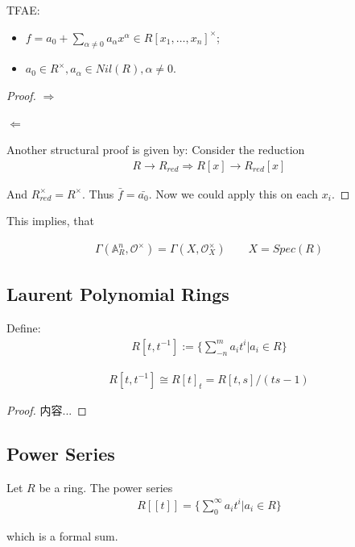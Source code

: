 \documentclass[Total.tex]{subfiles}
\begin{document}
			\begin{proposition}
				TFAE:
				\begin{itemize}
					\item $f=a_0+\sum_{\alpha\not=0} a_\alpha x^\alpha\in R[x_1,\dots,x_n]^\times$;
					\item $a_0\in R^\times,a_\alpha\in Nil(R),\alpha\not=0$. 
				\end{itemize}
			\end{proposition}
			\begin{proof}
				$\Rightarrow$
				
				$\Leftarrow$ 
				
				
				Another structural proof is given by: Consider the reduction
				\begin{gather*}
					R\rightarrow R_{red}\Rightarrow R[x]\rightarrow R_{red}[x]
				\end{gather*}
				
				And $R_{red}^\times=R^\times$. Thus $\bar{f}=\bar{a_0}$. Now we could apply this on each $x_i$. 
			\end{proof}
			
			This implies, that 
			
			\begin{gather*}
				\Gamma(\mathbb{A}^n_R,\mathcal{O}^\times)=\Gamma(X,\mathcal{O}^\times_X)\qquad X=Spec(R)
			\end{gather*}
		\subsection{Laurent Polynomial Rings}
			\begin{Def}
				Define:
				\begin{gather*}
					R[t,t^{-1}]:=\{\sum_{-n}^m a_i t^i|a_i\in R\}
				\end{gather*}
			\end{Def}
			
			\begin{proposition}
				\begin{gather*}
					R[t,t^{-1}]\cong R[t]_t=R[t,s]/(ts-1)
				\end{gather*}
			\end{proposition}
			\begin{proof}
				内容...
			\end{proof}
		\subsection{Power Series}
			\begin{Def}
				Let $R$ be a ring. The power series
				\begin{gather*}
					R[[t]]=\{\sum_0^\infty a_i t^i|a_i\in R\}
				\end{gather*}
				
				which is a formal sum. 
			\end{Def}
			
\end{document}
